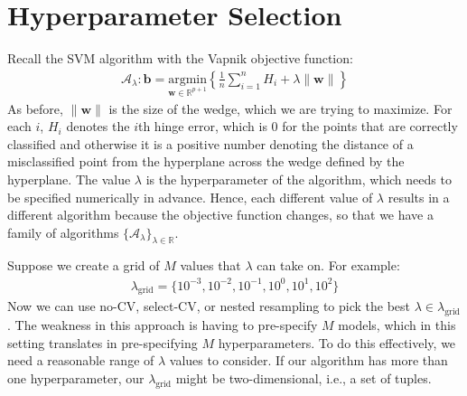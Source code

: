 \documentclass[12pt, a4paper]{article}
\theoremstyle{definition}
\begin{document}
	\section*{Hyperparameter Selection}
	Recall the SVM algorithm with the Vapnik objective function:
	\begin{align*}
		\mathcal{A}_{\lambda}:\bm{b} = \underset{\bm{w}\in\mathbb{R}^{p+1}}{\text{argmin}}
		\left\{
		\frac{1}{n}\sum_{i=1}^{n}H_i + 
		\lambda \|\bm{w}\|
		\right\}
	\end{align*}
	As before, $\|\bm{w}\|$ is the size of the wedge, which we are trying
	to maximize. For each $i$, $H_i$ denotes the $i$th hinge error, which is $0$
	for the points that are correctly classified and otherwise it is a positive
	number denoting the distance of a misclassified point from the hyperplane across
	the wedge defined by the hyperplane. The value $\lambda$ is the hyperparameter
	of the algorithm, which needs to be specified numerically in advance. Hence,
	each different value of $\lambda$ results in a different algorithm because
	the objective function changes, so that we have a family of algorithms
	$\{\mathcal{A}_\lambda\}_{\lambda\in\mathbb{R}}$.
	
	Suppose we create a grid of $M$ values that $\lambda$ can take on. For example:
	\begin{align*}
		\lambda_{\text{grid}} = \{
			10^{-3}, 10^{-2}, 10^{-1}, 10^0, 10^{1}, 10^{2}
		\}
	\end{align*}
	Now we can use no-CV, select-CV, or nested resampling to pick the best
	$\lambda\in \lambda_{\text{grid}}$. The weakness in this approach is having
	to pre-specify $M$ models, which in this setting translates in pre-specifying
	$M$ hyperparameters. To do this effectively, we need a reasonable range of $\lambda$
	values to consider. If our algorithm has more than one hyperparameter,
	our $\lambda_{\text{grid}}$ might be two-dimensional, i.e., a set of tuples.
	\pagebreak
	\printbibliography
\end{document}
